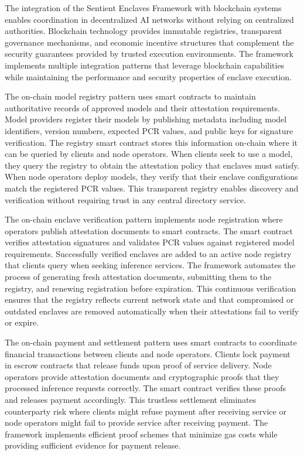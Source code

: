 The integration of the Sentient Enclaves Framework with blockchain systems enables coordination in decentralized AI networks without relying on centralized authorities. Blockchain technology provides immutable registries, transparent governance mechanisms, and economic incentive structures that complement the security guarantees provided by trusted execution environments. The framework implements multiple integration patterns that leverage blockchain capabilities while maintaining the performance and security properties of enclave execution.

The on-chain model registry pattern uses smart contracts to maintain authoritative records of approved models and their attestation requirements. Model providers register their models by publishing metadata including model identifiers, version numbers, expected PCR values, and public keys for signature verification. The registry smart contract stores this information on-chain where it can be queried by clients and node operators. When clients seek to use a model, they query the registry to obtain the attestation policy that enclaves must satisfy. When node operators deploy models, they verify that their enclave configurations match the registered PCR values. This transparent registry enables discovery and verification without requiring trust in any central directory service.

The on-chain enclave verification pattern implements node registration where operators publish attestation documents to smart contracts. The smart contract verifies attestation signatures and validates PCR values against registered model requirements. Successfully verified enclaves are added to an active node registry that clients query when seeking inference services. The framework automates the process of generating fresh attestation documents, submitting them to the registry, and renewing registration before expiration. This continuous verification ensures that the registry reflects current network state and that compromised or outdated enclaves are removed automatically when their attestations fail to verify or expire.

The on-chain payment and settlement pattern uses smart contracts to coordinate financial transactions between clients and node operators. Clients lock payment in escrow contracts that release funds upon proof of service delivery. Node operators provide attestation documents and cryptographic proofs that they processed inference requests correctly. The smart contract verifies these proofs and releases payment accordingly. This trustless settlement eliminates counterparty risk where clients might refuse payment after receiving service or node operators might fail to provide service after receiving payment. The framework implements efficient proof schemes that minimize gas costs while providing sufficient evidence for payment release.

